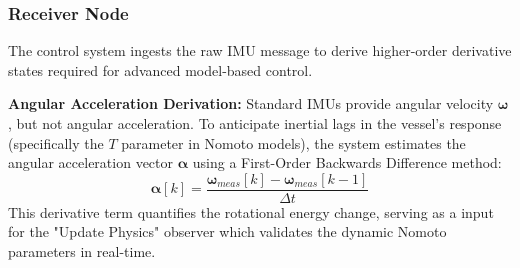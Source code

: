 \documentclass[12pt, a4paper, oneside]{report}
\begin{document}
\subsubsection{Receiver Node}
The control system ingests the raw IMU message to derive higher-order derivative states required for advanced model-based control.

\textbf{Angular Acceleration Derivation:}
Standard IMUs provide angular velocity $\boldsymbol{\omega}$, but not angular acceleration. To anticipate inertial lags in the vessel's response (specifically the $T$ parameter in Nomoto models), the system estimates the angular acceleration vector $\boldsymbol{\alpha}$ using a First-Order Backwards Difference method:
\begin{equation}
    \boldsymbol{\alpha}[k] = \frac{\boldsymbol{\omega}_{meas}[k] - \boldsymbol{\omega}_{meas}[k-1]}{\Delta t}
\end{equation}
This derivative term quantifies the rotational energy change, serving as a input for the "Update Physics" observer which validates the dynamic Nomoto parameters in real-time.
\end{document}
